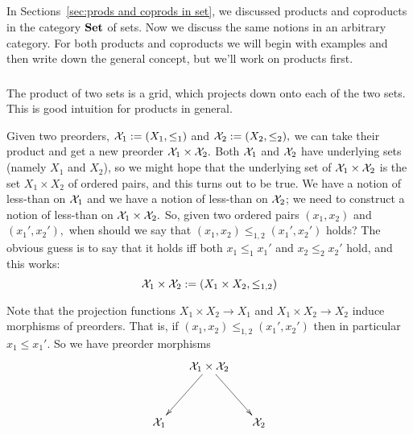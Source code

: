\documentclass[CT4S-EN-RU]{subfiles}
\begin{document}

\subsection{}

\begin{blockENG}
In Sections~\ref{sec:prods and coprods in set}, we discussed products and coproducts in the category ${\mathbf{Set}}$ of sets. Now we discuss the same notions in an arbitrary category. For both products and coproducts we will begin with examples and then write down the general concept, but we'll work on products first.
\end{blockENG}

\begin{blockRUS}
\end{blockRUS}


\subsubsection{}

\begin{blockENG}
The product of two sets is a grid, which projects down onto each of the two sets. This is good intuition for products in general.
\end{blockENG}

\begin{blockRUS}
\end{blockRUS}

\begin{exampleENG}\label{ex:product of preorders}
Given two preorders, $\mathcal{X}_1:=(X_1,\leq_1)$ and $\mathcal{X}_2:=(X_2,\leq_2),$ we can take their product and get a new preorder $\mathcal{X}_1\times\mathcal{X}_2.$ Both $\mathcal{X}_1$ and $\mathcal{X}_2$ have underlying sets (namely $X_1$ and $X_2$), so we might hope that the underlying set of $\mathcal{X}_1\times\mathcal{X}_2$ is the set $X_1\times X_2$ of ordered pairs, and this turns out to be true. We have a notion of less-than on $\mathcal{X}_1$ and we have a notion of less-than on $\mathcal{X}_2$; we need to construct a notion of less-than on $\mathcal{X}_1\times\mathcal{X}_2.$ So, given two ordered pairs $(x_1,x_2)$ and $(x_1',x_2'),$ when should we say that $(x_1,x_2)\leq_{1,2}(x_1',x_2')$ holds? The obvious guess is to say that it holds iff both $x_1\leq_1x_1'$ and $x_2\leq_2x_2'$ hold, and this works:
$$\mathcal{X}_1\times\mathcal{X}_2:=(X_1\times X_2,\leq_{1,2})$$

Note that the projection functions $X_1\times X_2\to X_1$ and $X_1\times X_2\to X_2$ induce morphisms of preorders. That is, if $(x_1,x_2)\leq_{1,2}(x_1',x_2')$ then in particular $x_1\leq x_1'.$ So we have preorder morphisms
$$\xymatrix@=15pt{&\mcX_1\times\mcX_2\ar[ldd]\ar[rdd]\\\\\mcX_1&&\mcX_2}$$
\end{exampleENG}
\end{document}
